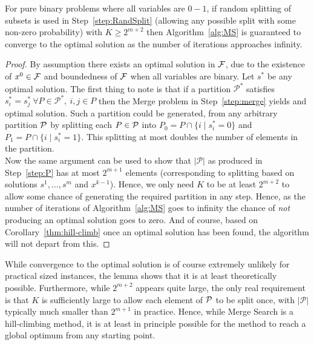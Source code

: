 \documentclass[journal]{IEEEtran}
\begin{document}
\begin{lemma}\label{thm:optimal}
  For pure binary problems where all variables are $0-1$, if random splitting of subsets is used in Step~\ref{step:RandSplit} (allowing any possible split with some non-zero probability) with $K\ge 2^{m+2}$ then Algorithm~\ref{alg:MS} is guaranteed to converge to the optimal solution as the number of iterations approaches infinity. 
\end{lemma}
\begin{proof}
  By assumption there exists an optimal solution in $\cal F$, due to the existence of $x^0\in\cal F$ and boundedness of $\cal F$ when all variables are binary. Let $s^*$ be any optimal solution. The first thing to note is that if a partition $\mathcal{P}^*$ satisfies $s^*_i=s^*_j\ \forall P\in \mathcal{P}^*,\ i,j\in P$ then the Merge problem in Step~\ref{step:merge} yields and optimal solution. 
  Such a partition could be generated, from any arbitrary partition $\cal P$ by splitting each $P\in\cal P$ into $P_0=P\cap \{i\mid s^*_i=0\}$ and $P_1=P\cap \{i\mid s^*_i=1\}$. This splitting at most doubles the number of elements in the partition. \\
  Now the same argument can be used to show that $|\mathcal{P}|$ as produced in Step~\ref{step:P} has at most $2^{m+1}$ elements (corresponding to splitting based on solutions $s^1,\ldots,s^m$ and $x^{k-1}$). Hence, we only need $K$ to be at least $2^{m+2}$ to allow some chance of generating the required partition in any step. Hence, as the number of iterations of Algorithm~\ref{alg:MS} goes to infinity the chance of \emph{not} producing an optimal solution goes to zero. And of course, based on Corollary~\ref{thm:hill-climb} once an optimal solution has been found, the algorithm will not depart from this.
\end{proof}
While convergence to the optimal solution is of course extremely unlikely for practical sized instances, the lemma shows that it is at least theoretically possible. Furthermore, while $2^{m+2}$ appears quite large, the only real requirement is that $K$ is sufficiently large to allow each element of $\cal P$ to be split once, with $|\mathcal{P}|$ typically much smaller than $2^{m+1}$ in practice. Hence, while Merge Search is a hill-climbing method, it is at least in principle possible for the method to reach a global optimum from any starting point.
\end{document}
